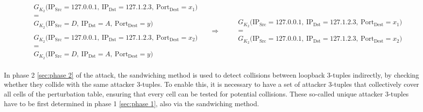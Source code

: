 \documentclass{report}
\begin{document}
\begin{center}
\begin{adjustbox}{scale=0.9}
  \begin{minipage}{1.1\textwidth}
    \[
\begin{aligned}
&
\begin{aligned}
& \begin{array}{c}
G_{K_2}\bigl(\text{IP}_{\text{Src}} = 127.0.0.1,\ \text{IP}_{\text{Dst}} = 127.1.2.3,\ \text{Port}_{\text{Dest}} = x_1 \bigr) \\[0.3em]
= \\[0.3em]
G_{K_2}\bigl(\text{IP}_{\text{Src}} = D,\ \text{IP}_{\text{Dst}} = A,\ \text{Port}_{\text{Dest}} = y \bigr)
\end{array}
\\[1em]
& \begin{array}{c}
G_{K_2}\bigl(\text{IP}_{\text{Src}} = 127.0.0.1,\ \text{IP}_{\text{Dst}} = 127.1.2.3,\ \text{Port}_{\text{Dest}} = x_2 \bigr) \\[0.3em]
= \\[0.3em]
G_{K_2}\bigl(\text{IP}_{\text{Src}} = D,\ \text{IP}_{\text{Dst}} = A,\ \text{Port}_{\text{Dest}} = y \bigr)
\end{array}
\end{aligned}
\quad \Longrightarrow \quad
\begin{aligned}
& \begin{array}{c}
G_{K_2}\bigl(\text{IP}_{\text{Src}} = 127.0.0.1,\ \text{IP}_{\text{Dst}} = 127.1.2.3,\ \text{Port}_{\text{Dest}} = x_1 \bigr) \\[0.3em]
= \\[0.3em]
G_{K_2}\bigl(\text{IP}_{\text{Src}} = 127.0.0.1,\ \text{IP}_{\text{Dst}} = 127.1.2.3,\ \text{Port}_{\text{Dest}} = x_2 \bigr)
\end{array}
\end{aligned}
\end{aligned}
\]
  \end{minipage}
\end{adjustbox}
\end{center}

In phase 2 \ref{sec:phase 2} of the attack, the sandwiching method is used to detect collisions between loopback 3-tuples indirectly, by checking whether they collide with the same attacker 3-tuples. To enable this, it is necessary to have a set of attacker 3-tuples that collectively cover all cells of the perturbation table, ensuring that every cell can be tested for potential collisions. These so-called \alert{unique attacker 3-tuples} have to be first determined in phase 1 \ref{sec:phase 1}, also via the sandwiching method.
\end{document}
